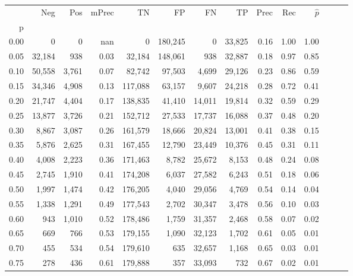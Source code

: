 \begin{tabular}{rrrrrrrrrrrrrr}
\toprule
{} &     Neg &    Pos & mPrec &       TN &       FP &      FN &      TP &  Prec &   Rec & $\hat{p}$ \\
p    &         &        &       &          &          &         &         &       &       &           \\
\midrule
0.00 &       0 &      0 &   nan &        0 &  180,245 &       0 &  33,825 &  0.16 &  1.00 &      1.00 \\
0.05 &  32,184 &    938 &  0.03 &   32,184 &  148,061 &     938 &  32,887 &  0.18 &  0.97 &      0.85 \\
0.10 &  50,558 &  3,761 &  0.07 &   82,742 &   97,503 &   4,699 &  29,126 &  0.23 &  0.86 &      0.59 \\
0.15 &  34,346 &  4,908 &  0.13 &  117,088 &   63,157 &   9,607 &  24,218 &  0.28 &  0.72 &      0.41 \\
0.20 &  21,747 &  4,404 &  0.17 &  138,835 &   41,410 &  14,011 &  19,814 &  0.32 &  0.59 &      0.29 \\
0.25 &  13,877 &  3,726 &  0.21 &  152,712 &   27,533 &  17,737 &  16,088 &  0.37 &  0.48 &      0.20 \\
0.30 &   8,867 &  3,087 &  0.26 &  161,579 &   18,666 &  20,824 &  13,001 &  0.41 &  0.38 &      0.15 \\
0.35 &   5,876 &  2,625 &  0.31 &  167,455 &   12,790 &  23,449 &  10,376 &  0.45 &  0.31 &      0.11 \\
0.40 &   4,008 &  2,223 &  0.36 &  171,463 &    8,782 &  25,672 &   8,153 &  0.48 &  0.24 &      0.08 \\
0.45 &   2,745 &  1,910 &  0.41 &  174,208 &    6,037 &  27,582 &   6,243 &  0.51 &  0.18 &      0.06 \\
0.50 &   1,997 &  1,474 &  0.42 &  176,205 &    4,040 &  29,056 &   4,769 &  0.54 &  0.14 &      0.04 \\
0.55 &   1,338 &  1,291 &  0.49 &  177,543 &    2,702 &  30,347 &   3,478 &  0.56 &  0.10 &      0.03 \\
0.60 &     943 &  1,010 &  0.52 &  178,486 &    1,759 &  31,357 &   2,468 &  0.58 &  0.07 &      0.02 \\
0.65 &     669 &    766 &  0.53 &  179,155 &    1,090 &  32,123 &   1,702 &  0.61 &  0.05 &      0.01 \\
0.70 &     455 &    534 &  0.54 &  179,610 &      635 &  32,657 &   1,168 &  0.65 &  0.03 &      0.01 \\
0.75 &     278 &    436 &  0.61 &  179,888 &      357 &  33,093 &     732 &  0.67 &  0.02 &      0.01 \\

\end{tabular}
